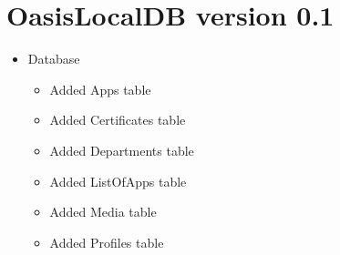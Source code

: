 \section{OasisLocalDB version 0.1}
\begin{itemize}
	\item Database
	\begin{itemize}
		\item Added Apps table
		\item Added Certificates table
		\item Added Departments table
		\item Added ListOfApps table
		\item Added Media table
		\item Added Profiles table
	\end{itemize}
\end{itemize}